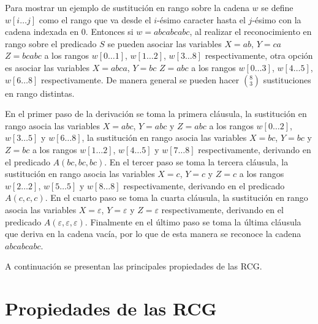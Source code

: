 Para mostrar un ejemplo de sustitución en rango sobre la cadena $w$ se define $w[i\dots j]$ como
el rango que va desde el $i$-ésimo caracter hasta el $j$-ésimo con la cadena indexada en 0. Entonces
si $w=abcabcabc$, al realizar el reconocimiento en rango sobre el predicado $S$ se pueden asociar
las variables $X=ab$, $Y=ca$ $Z=bcabc$ a los rangos $w[0\dots 1]$, $w[1\dots 2]$, $w[3\dots 8]$ respectivamente, otra
opción es asociar las variables $X=abca$, $Y=bc$ $Z=abc$ a los rangos $w[0\dots 3]$, $w[4\dots 5]$, $w[6\dots 8]$ respectivamente. De manera
general se pueden hacer $(^8_3)$ sustituciones en rango distintas.

En el primer paso de la derivación se toma la primera cláusula, la sustitución en rango asocia las variables $X=abc$, $Y=abc$ y $Z=abc$
a los rangos $w[0\dots 2]$, $w[3\dots 5]$ y $w[6\dots 8]$, la sustitución en rango asocia las variables $X=bc$, $Y=bc$ y $Z=bc$ a los rangos $w[1\dots 2]$, $w[4\dots 5]$ y $w[7\dots 8]$
respectivamente, derivando en el predicado $A(bc,bc,bc)$. En el tercer paso se toma la tercera cláusula,
la sustitución en rango asocia las variables $X=c$, $Y=c$ y $Z=c$ a los rangos $w[2\dots 2]$, $w[5\dots 5]$ y
$w[8\dots 8]$ respectivamente, derivando en el predicado $A(c,c,c)$.
En el cuarto paso se toma la cuarta cláusula, la sustitución en rango asocia las variables
$X=\varepsilon$, $Y=\varepsilon$ y $Z=\varepsilon$ respectivamente, derivando en el predicado
$A(\varepsilon,\varepsilon,\varepsilon)$. Finalmente en el  último paso se toma la última cláusula
que deriva en la cadena vacía, por lo que de esta manera se reconoce la cadena $abcabcabc$.

A continuación se presentan las principales propiedades de las RCG.
\section{Propiedades de las RCG}

